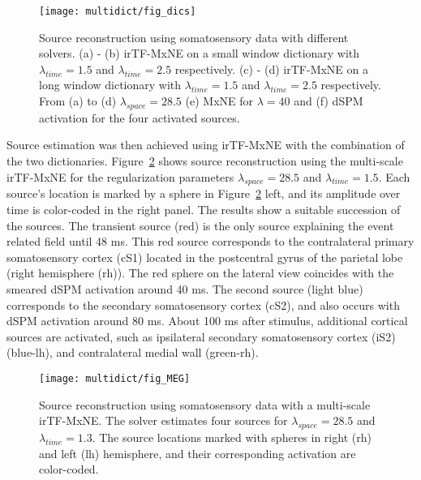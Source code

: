 \begin{figure}
\centering
	\texttt{[image: multidict/fig\_dics]}
    \caption{Source reconstruction using somatosensory data with different solvers. (a) - (b) irTF-MxNE on a small window dictionary with $\lambda_{time}=1.5$ and $\lambda_{time}=2.5$ respectively. (c) - (d) irTF-MxNE on a long window dictionary with $\lambda_{time}=1.5$ and $\lambda_{time}=2.5$ respectively. From (a) to (d) $\lambda_{space}=28.5$ (e) MxNE for $\lambda=40$ and (f) dSPM activation for the four activated sources.}
    \label{fig:MEG_dics}
\end{figure}

Source estimation was then achieved using irTF-MxNE with the combination of the two dictionaries.
Figure~\ref{fig:MEG} shows source reconstruction using the multi-scale irTF-MxNE for the regularization parameters $\lambda_{space}=28.5$ and $\lambda_{time}=1.5$. Each source's location is marked by a sphere in Figure~\ref{fig:MEG} left, and its amplitude over time is color-coded in the right panel. The results show a suitable succession of the sources. The transient source (red) is the only source explaining the event related field until 48 ms. This red source corresponds to the contralateral primary somatosensory cortex (cS1) located in the postcentral gyrus of the parietal lobe (right hemisphere (rh)). The red sphere on the lateral view coincides with the smeared dSPM activation around 40 ms. The second source (light blue) corresponds to the secondary somatosensory cortex (cS2), and also occurs with dSPM activation around 80 ms. About 100 ms after stimulus, additional cortical sources are activated, such as ipsilateral secondary somatosensory cortex (iS2) (blue-lh), and contralateral medial wall (green-rh). 

\begin{figure}
\centering
	\texttt{[image: multidict/fig\_MEG]}
    \caption{Source reconstruction using somatosensory data with a multi-scale irTF-MxNE. The solver estimates four sources for $\lambda_{space}=28.5$ and $\lambda_{time}=1.3$. The source locations marked with spheres in right (rh) and left (lh) hemisphere, and their corresponding activation are color-coded.}
	\label{fig:MEG}
\end{figure}

